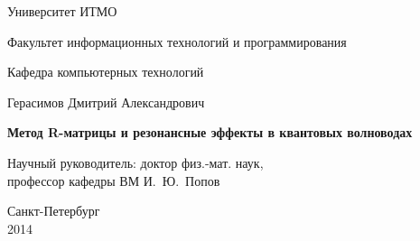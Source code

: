 \documentclass[a4paper]{report}
\theoremstyle{plain}
\theoremstyle{definition}
\numberwithin{theorem}{chapter}        %
\begin{document}
\initializefrontsections

\pagestyle{title}

\begin{center}
Университет ИТМО

\vspace{2cm}

Факультет информационных технологий и программирования

Кафедра компьютерных технологий

\vspace{3cm}

{\Large Герасимов Дмитрий Александрович}

\vspace{2cm}

\vbox{\LARGE\bfseries
Метод R-матрицы и резонансные эффекты в квантовых волноводах
}

\vspace{4cm}

{\Large Научный руководитель: доктор физ.-мат. наук, \\ профессор кафедры ВМ И.~Ю.~Попов}

\vspace{6cm}

Санкт-Петербург\\ 2014
\end{center}

\newpage

\setcounter{page}{3}
\pagestyle{plain}

\tableofcontents

\startthechapters







\printbibliography

%
\end{document}
